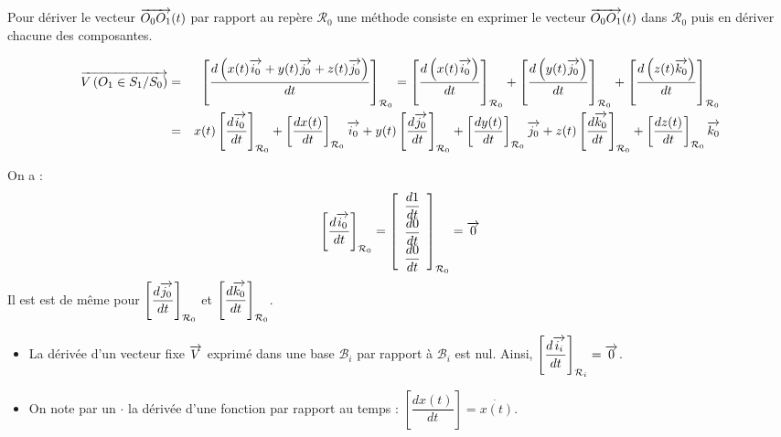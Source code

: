 \documentclass[10pt,oneside]{article}
\begin{document}
\begin{rem}
Pour dériver le vecteur $\overrightarrow{O_0 O_1}(t)$ par rapport au repère $\mathcal{R}_0$ une méthode consiste en exprimer le vecteur $\overrightarrow{O_0 O_1}(t)$ dans $\mathcal{R}_0$ puis en dériver chacune des composantes. 
\end{rem}

\begin{eqnarray*}
\overrightarrow{V\left( {O_1} \in {S_1}/{S_0}\right)} &=&  
\left[\dfrac{d\left(x(t)\overrightarrow{i_0}+y(t)\overrightarrow{j_0}+z(t)\overrightarrow{j_0} \right)}{dt}\right]_{\mathcal{R}_0}
= 
\left[\dfrac{d\left(x(t)\overrightarrow{i_0}\right)}{dt}\right]_{\mathcal{R}_0}
+\left[\dfrac{d\left(y(t)\overrightarrow{j_0}\right)}{dt}\right]_{\mathcal{R}_0}
+\left[\dfrac{d\left(z(t)\overrightarrow{k_0}\right)}{dt}\right]_{\mathcal{R}_0} \\
&=&
x(t)\left[\dfrac{d\overrightarrow{i_0}}{dt}\right]_{\mathcal{R}_0}
+ \left[\dfrac{dx(t)}{dt}\right]_{\mathcal{R}_0} \overrightarrow{i_0}
+y(t)\left[\dfrac{d\overrightarrow{j_0}}{dt}\right]_{\mathcal{R}_0}
+ \left[\dfrac{dy(t)}{dt}\right]_{\mathcal{R}_0} \overrightarrow{j_0}
+z(t)\left[\dfrac{d\overrightarrow{k_0}}{dt}\right]_{\mathcal{R}_0}
+ \left[\dfrac{dz(t)}{dt}\right]_{\mathcal{R}_0} \overrightarrow{k_0} \\
\end{eqnarray*}

On a : 
$$
\left[\dfrac{d\overrightarrow{i_0}}{dt}\right]_{\mathcal{R}_0} = 
\left[
\begin{array}{c}
\dfrac{d 1}{dt}\\
\dfrac{d 0}{dt}\\
\dfrac{d  0}{dt}\\
\end{array}
\right]_{\mathcal{R}_0}
 = \overrightarrow{0}
$$
Il est est de même pour $\left[\dfrac{d\overrightarrow{j_0}}{dt}\right]_{\mathcal{R}_0}$ et $\left[\dfrac{d\overrightarrow{k_0}}{dt}\right]_{\mathcal{R}_0}$.

\begin{rem}
\begin{itemize}
\item La dérivée d'un vecteur fixe $\overrightarrow{V}$ exprimé dans une base $\mathcal{B}_i$ par rapport à $\mathcal{B}_i$ est nul. Ainsi,  $\left[\dfrac{d\overrightarrow{i_i}}{dt}\right]_{\mathcal{R}_i}=\overrightarrow{0}$.
\item On note par un $\cdot$ la dérivée d'une fonction par rapport au temps : $\left[\dfrac{dx(t)}{dt}\right] = \dot{x(t)}$.
\end{itemize}

\end{rem}
\end{document}
